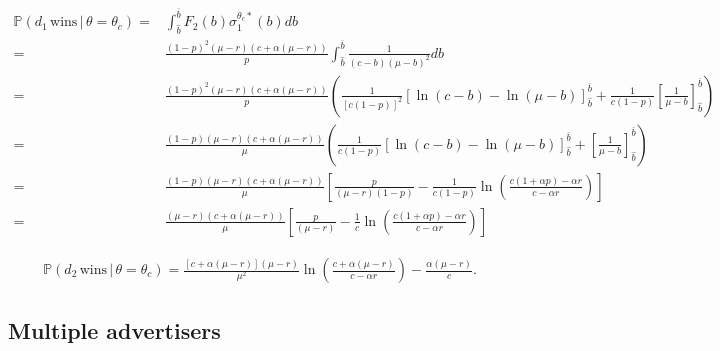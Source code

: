\documentclass[11pt]{article}
\theoremstyle{plain}
\theoremstyle{definition}
\theoremstyle{plain}
\theoremstyle{plain}
\theoremstyle{plain}
\theoremstyle{plain}
\numberwithin{equation}{section}
\begin{document}
{\footnotesize
\begin{align*}
    \mathbb{P}(d_1 \, \text{wins} \, | \, \theta = \theta_c) = & \int_{\hat{b}}^{\overline{b}} F_2(b)\sigma_1^{\theta_c *}(b) db \\[5pt]
    = & \frac{(1-p)^2(\mu-r)(c+\alpha(\mu-r))}{p}\int_{\hat{b}}^{\overline{b}} \frac{1}{(c-b)(\mu-b)^2} db \\[5pt]
    = &\frac{(1-p)^2(\mu-r)(c+\alpha(\mu-r))}{p} \left( \frac{1}{[c(1-p)]^2}\left[\ln(c-b) - \ln(\mu-b) \right]^{\overline{b}}_{\hat{b}} + \frac{1}{c(1-p)} \left[\frac{1}{\mu-b} \right]^{\overline{b}}_{\hat{b}} \right) \\[5pt]
    = & \frac{(1-p)(\mu-r)(c+\alpha(\mu-r))}{\mu} \left( \frac{1}{c(1-p)}\left[\ln(c-b) - \ln(\mu-b) \right]^{\overline{b}}_{\hat{b}} + \left[\frac{1}{\mu-b} \right]^{\overline{b}}_{\hat{b}} \right) \\[5pt]
    = & \frac{(1-p)(\mu-r)(c+\alpha(\mu-r))}{\mu} \left[\frac{p}{(\mu-r)(1-p)}- \frac{1}{c(1-p)}\ln \left(\frac{c(1+\alpha p) - \alpha r}{c-\alpha r} \right) \right]
    \\[5pt]
    = & \frac{(\mu-r)(c+\alpha(\mu-r))}{\mu} \left[\frac{p}{(\mu-r)}- \frac{1}{c}\ln \left(\frac{c(1+\alpha p) - \alpha r}{c-\alpha r} \right) \right]
\end{align*}
}

\begin{align*}
\mathbb{P}(d_2 \, \text{wins} \, | \, \theta = \theta_c) = \frac{[c+\alpha(\mu-r)](\mu-r)}{\mu^2}\ln \left(\frac{c+\alpha(\mu-r)}{c-\alpha r} \right) - \frac{\alpha(\mu-r)}{c}.
\end{align*}
\vspace{4mm}

\subsection{Multiple advertisers}
\end{document}
